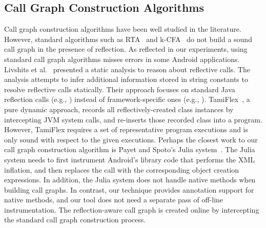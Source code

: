 


\tinystep

\subsection{Call Graph Construction Algorithms}

\begin{comment}
We briefly mention some call graph construction
algorithms for Java. Grove et al.~\cite{kcfa} described a unified
framework for expressing call graph construction algorithms, and
studied different instantiations of the framework.
Tip and Palsberg~\cite{xta} quantitatively compared
several low-cost call graph construction algorithms for Java.
Sundaresan et al.~\cite{Sundaresan:2000} went beyond the
RTA~\cite{rta} approach and used type propagation
to build a more precise call graph.  However,
those algorithms do not build a sound call graph in the presence of reflection.
As reflected in our experiments, using standard call graph algorithms
misses errors in some Android applications.

\end{comment}

Call graph construction algorithms have been well studied in the literature. However,
standard algorithms such as RTA~\cite{rta} and k-CFA~\cite{kcfa} do not build
a sound call graph in the presence of reflection.
As reflected in our experiments, using standard call graph algorithms
misses errors in some Android applications.
Livshits et al.~\cite{Livshits:2005} presented a static analysis
to reason about reflective calls. The analysis
attempts to infer additional information stored in string constants to resolve
reflective calls statically. Their approach focuses on standard Java
reflection calls (e.g., ) instead of
framework-specific ones (e.g., ).
TamiFlex~\cite{Bodden:2011}, a pure dynamic
approach, records all reflectively-created class instances
by intercepting JVM system calls, and re-inserts those recorded 
class into a program. However, TamiFlex requires a set of representative
program executions and is only sound with respect to the given executions.
Perhaps the closest work to our call graph
construction algorithm is Payet and Spoto's Julia
system~\cite{Payet:2011:SAA:2032266.2032299}. The Julia system
needs to first instrument Android's library code that performs the XML inflation,
and then replaces the  call with the corresponding
object creation expressions. In addition, the Julia system does not handle
native methods when building call graphs. In contrast, our technique provides
annotation support for native methods, and our tool does not need a separate
pass of off-line instrumentation. The reflection-aware call graph is created
online by intercepting the standard call graph construction process.

